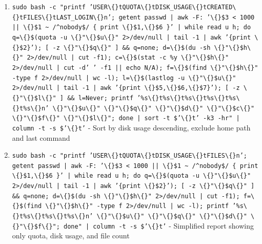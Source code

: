 \documentclass{article}
\begin{document}
\begin{enumerate}
  \item \texttt{sudo bash -c "printf 'USER\textbackslash\{\}tQUOTA\textbackslash\{\}tDISK\_USAGE\textbackslash\{\}tCREATED\textbackslash\{\}tFILES\textbackslash\{\}tLAST\_LOGIN\textbackslash\{\}n'; getent passwd | awk -F: '\textbackslash\{\}\$3 < 1000 || \textbackslash\{\}\$1 \textasciitilde{} /\textasciicircum{}nobody\$/ \{ print \textbackslash\{\}\$1,\textbackslash\{\}\$6 \}' | while read u h; do q=\textbackslash\{\}\$(quota -u \textbackslash\{\}"\textbackslash\{\}\$u\textbackslash\{\}" 2>/dev/null | tail -1 | awk '\{print \textbackslash\{\}\$2\}'); [ -z \textbackslash\{\}"\textbackslash\{\}\$q\textbackslash\{\}" ] \&\& q=none; d=\textbackslash\{\}\$(du -sh \textbackslash\{\}"\textbackslash\{\}\$h\textbackslash\{\}" 2>/dev/null | cut -f1); c=\textbackslash\{\}\$(stat -c \%y \textbackslash\{\}"\textbackslash\{\}\$h\textbackslash\{\}" 2>/dev/null | cut -d' ' -f1 || echo N/A); f=\textbackslash\{\}\$(find \textbackslash\{\}"\textbackslash\{\}\$h\textbackslash\{\}" -type f 2>/dev/null | wc -l); l=\textbackslash\{\}\$(lastlog -u \textbackslash\{\}"\textbackslash\{\}\$u\textbackslash\{\}" 2>/dev/null | tail -1 | awk '\{print \textbackslash\{\}\$5,\textbackslash\{\}\$6,\textbackslash\{\}\$7\}'); [ -z \textbackslash\{\}"\textbackslash\{\}\$l\textbackslash\{\}" ] \&\& l=Never; printf '\%s\textbackslash\{\}t\%s\textbackslash\{\}t\%s\textbackslash\{\}t\%s\textbackslash\{\}t\%s\textbackslash\{\}t\%s\textbackslash\{\}n' \textbackslash\{\}"\textbackslash\{\}\$u\textbackslash\{\}" \textbackslash\{\}"\textbackslash\{\}\$q\textbackslash\{\}" \textbackslash\{\}"\textbackslash\{\}\$d\textbackslash\{\}" \textbackslash\{\}"\textbackslash\{\}\$c\textbackslash\{\}" \textbackslash\{\}"\textbackslash\{\}\$f\textbackslash\{\}" \textbackslash\{\}"\textbackslash\{\}\$l\textbackslash\{\}"; done | sort -t \$'\textbackslash\{\}t' -k3 -hr" | column -t -s \$'\textbackslash\{\}t'} - Sort by disk usage descending, exclude home path and last command
  \item \texttt{sudo bash -c "printf 'USER\textbackslash\{\}tQUOTA\textbackslash\{\}tDISK\_USAGE\textbackslash\{\}tFILES\textbackslash\{\}n'; getent passwd | awk -F: '\textbackslash\{\}\$3 < 1000 || \textbackslash\{\}\$1 \textasciitilde{} /\textasciicircum{}nobody\$/ \{ print \textbackslash\{\}\$1,\textbackslash\{\}\$6 \}' | while read u h; do q=\textbackslash\{\}\$(quota -u \textbackslash\{\}"\textbackslash\{\}\$u\textbackslash\{\}" 2>/dev/null | tail -1 | awk '\{print \textbackslash\{\}\$2\}'); [ -z \textbackslash\{\}"\textbackslash\{\}\$q\textbackslash\{\}" ] \&\& q=none; d=\textbackslash\{\}\$(du -sh \textbackslash\{\}"\textbackslash\{\}\$h\textbackslash\{\}" 2>/dev/null | cut -f1); f=\textbackslash\{\}\$(find \textbackslash\{\}"\textbackslash\{\}\$h\textbackslash\{\}" -type f 2>/dev/null | wc -l); printf '\%s\textbackslash\{\}t\%s\textbackslash\{\}t\%s\textbackslash\{\}t\%s\textbackslash\{\}n' \textbackslash\{\}"\textbackslash\{\}\$u\textbackslash\{\}" \textbackslash\{\}"\textbackslash\{\}\$q\textbackslash\{\}" \textbackslash\{\}"\textbackslash\{\}\$d\textbackslash\{\}" \textbackslash\{\}"\textbackslash\{\}\$f\textbackslash\{\}"; done" | column -t -s \$'\textbackslash\{\}t'} - Simplified report showing only quota, disk usage, and file count

\end{enumerate}
\end{document}
